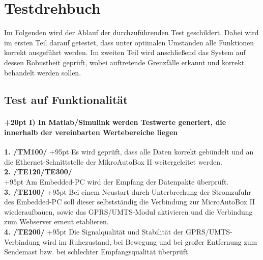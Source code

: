 \documentclass[fontsize = 12pt, paper = a4]{scrreprt}
\begin{document}
\chapter{Testdrehbuch}

Im Folgenden wird der Ablauf der durchzuführenden Test geschildert. Dabei wird im ersten Teil darauf getestet, dass unter optimalen Umständen alle Funktionen korrekt ausgeführt werden. Im zweiten Teil wird anschließend das System auf dessen Robustheit geprüft, wobei auftretende Grenzfälle erkannt und korrekt behandelt werden sollen.


\section{Test auf Funktionalität}
\subsubsection*{
\hangindent+20pt 
I) In Matlab/Simulink werden Testwerte generiert, die innerhalb der vereinbarten Wertebereiche liegen \\}

\vspace*{3mm}

\textbf{1. /TM100/}
\hangindent+95pt 
\hspace*{5.5mm} 
Es wird geprüft, dass alle Daten korrekt gebündelt und an die Ethernet-Schnittstelle der MikroAutoBox II weitergeleitet werden. \\

\textbf{2. /TE120/TE300/}\\
\hangindent+95pt 
Am Embedded-PC wird der Empfang der Datenpakte überprüft.\\

\textbf{3. /TE100/}
\hangindent+95pt 
\hspace*{8.2mm} 
Bei einem Neustart durch Unterbrechung der Stromzufuhr des Embedded-PC soll dieser selbstständig die Verbindung zur MicroAutoBox II wiederaufbauen, sowie das GPRS/UMTS-Modul aktivieren und die Verbindung zum Webserver erneut etablieren.\\

\textbf{4. /TE200/}
\hangindent+95pt 
\hspace*{8mm} 
Die Signalqualität und Stabilität der GPRS/UMTS-Verbindung wird im Ruhezustand, bei Bewegung und bei großer Entfernung zum Sendemast bzw. bei schlechter Empfangsqualität überprüft.\\
\end{document}

